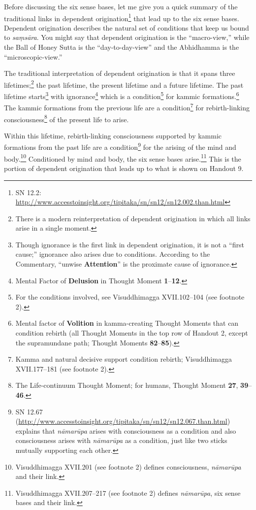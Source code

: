 Before discussing the six sense bases, let me give you a quick summary of the traditional links in dependent origination\footnote{SN 12.2: \url{http://www.accesstoinsight.org/tipitaka/sn/sn12/sn12.002.than.html}} that lead up to the six sense bases. Dependent origination describes the natural set of conditions that keep us bound to \textit{saṃsāra}. You might say that dependent origination is the “macro-view,” while the Ball of Honey Sutta is the “day-to-day-view” and the Abhidhamma is the “microscopic-view.”

The traditional interpretation of dependent origination is that it spans three lifetimes;\footnote{There is a modern reinterpretation of dependent origination in which all links arise in a single moment.} the past lifetime, the present lifetime and a future lifetime. The past lifetime starts\footnote{Though ignorance is the first link in dependent origination, it is not a “first cause;” ignorance also arises due to conditions. According to the Commentary, “unwise \textbf{Attention}” is the proximate cause of ignorance.} with ignorance\footnote{Mental Factor of \textbf{Delusion} in Thought Moment \textbf{1}--\textbf{12}.} which is a condition\footnote{For the conditions involved, see Visuddhimagga XVII.102--104 (see footnote 2).} for kammic formations.\footnote{Mental factor of \textbf{Volition} in kamma-creating Thought Moments that can condition rebirth (all Thought Moments in the top row of Handout 2, except the supramundane path; Thought Moments \textbf{82}--\textbf{85}).} The kammic formations from the previous life are a condition\footnote{Kamma and natural decisive support condition rebirth; Visuddhimagga XVII.177--181 (see footnote 2).} for rebirth-linking consciousness\footnote{The Life-continuum Thought Moment; for humans, Thought Moment \textbf{27}, \textbf{39}--\textbf{46}.} of the present life to arise.

Within this lifetime, rebirth-linking consciousness supported by kammic formations from the past life are a condition\footnote{SN 12.67 (\url{http://www.accesstoinsight.org/tipitaka/sn/sn12/sn12.067.than.html}) explains that \textit{nāmarūpa} arises with consciousness as a condition and also consciousness arises with \textit{nāmarūpa} as a condition, just like two sticks mutually supporting each other.} for the arising of the mind and body.\footnote{Visuddhimagga XVII.201 (see footnote 2) defines consciousness, \textit{nāmarūpa} and their link.} Conditioned by mind and body, the six sense bases arise.\footnote{Visuddhimagga XVII.207--217 (see footnote 2) defines \textit{nāmarūpa}, six sense bases and their link.} This is the portion of dependent origination that leads up to what is shown on Handout 9.

